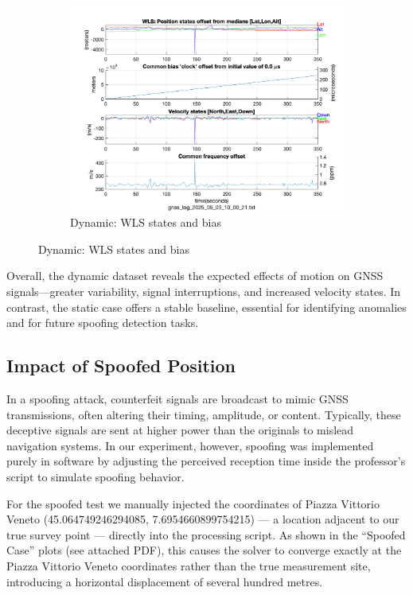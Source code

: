 \begin{figure}[h!]
\begin{subfigure}{0.23\textwidth}
                \includegraphics[width=\textwidth]{images/tests/Tram_15_trip_Castello_to_Pescatore/png/Samsung_A51_Tram_15_trip_Castello_to_Pescatore_fig5.png}
                \caption{Dynamic: WLS states and bias}
            \end{subfigure}
        \end{figure}
    
        \vspace{0.5em}
        \noindent Overall, the dynamic dataset reveals the expected effects of motion on GNSS signals—greater variability, signal interruptions, and increased velocity states. 
        In contrast, the static case offers a stable baseline, essential for identifying anomalies and for future spoofing detection tasks.

    \subsection{Impact of Spoofed Position}

        In a spoofing attack, counterfeit signals are broadcast to mimic GNSS transmissions, often altering their timing, amplitude, or content. 
        Typically, these deceptive signals are sent at higher power than the originals to mislead navigation systems. 
        In our experiment, however, spoofing was implemented purely in software by adjusting the perceived reception time inside the professor’s script to simulate spoofing behavior.
            
        \noindent For the spoofed test we manually injected the coordinates of Piazza Vittorio Veneto (45.064749246294085, 7.6954660899754215) — a location adjacent to our true survey point — directly into the processing script. 
        As shown in the “Spoofed Case” plots (see attached PDF), this causes the solver to converge exactly at the Piazza Vittorio Veneto coordinates rather than the true measurement site, introducing a horizontal displacement of several hundred metres.
        
